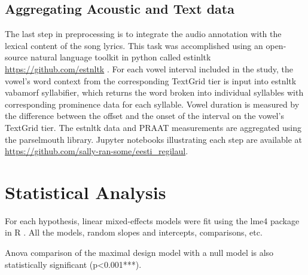 %
%
%
%
%



\subsection{Aggregating Acoustic and Text data}

The last step in preprocessing is to integrate the audio annotation with the lexical content of the song lyrics. This task was accomplished using an open-source natural language toolkit in python called estinltk \url{https://github.com/estnltk} \citep{estnltk2020}. For each vowel interval included  in the study, the vowel's word context from the corresponding TextGrid tier is input into estnltk vabamorf syllabifier, which returns the word broken into individual syllables with corresponding prominence data for each syllable. Vowel duration is measured by the difference between the offset and the onset of the interval on the vowel's TextGrid tier. The estnltk data and PRAAT measurements are aggregated using the parselmouth library\citep{parselmouth2018, python1995}. Jupyter notebooks illustrating each step are available at  \url{https://github.com/sally-ran-some/eesti_regilaul}. 





\section{Statistical Analysis} 
For each hypothesis, linear mixed-effects models were fit using the lme4 package in R \citep{lme4,r2022}. All the models, random slopes and intercepts, comparisons, etc. 


Anova comparison of the maximal design model with a null model is also statistically significant (p<0.001***). 
